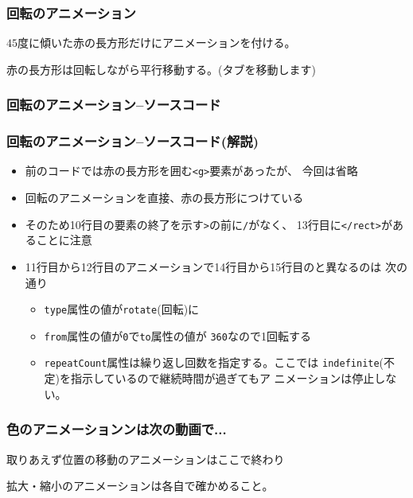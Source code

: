 \begin{frame}[containsverbatim]
 \frametitle{回転のアニメーション}
 $45$度に傾いた赤の長方形だけにアニメーションを付ける。

 赤の長方形は回転しながら平行移動する。(タブを移動します)
\end{frame}
\begin{frame}[containsverbatim]
 \frametitle{回転のアニメーション--ソースコード}
\end{frame}
\begin{frame}[containsverbatim]
 \frametitle{回転のアニメーション--ソースコード(解説)}
 \begin{itemize}
  \item 前のコードでは赤の長方形を囲む\texttt{<g>}要素があったが、
        今回は省略
  \item 回転のアニメーションを直接、赤の長方形につけている
  \item そのため10行目の要素の終了を示す\texttt{>}の前に\texttt{/}がなく、
        13行目に\texttt{</rect>}があることに注意
  \item 11行目から12行目のアニメーションで14行目から15行目のと異なるのは
        次の通り
  \begin{itemize}
   \item \texttt{type}属性の値が\texttt{rotate}(回転)に
   \item \texttt{from}属性の値が\texttt{0}で\texttt{to}属性の値が
         \texttt{360}なので1回転する
   \item \texttt{repeatCount}属性は繰り返し回数を指定する。ここでは
         \texttt{indefinite}(不定)を指示しているので継続時間が過ぎてもア
         ニメーションは停止しない。
  \end{itemize}
 \end{itemize}
\end{frame}
\begin{frame}[containsverbatim]
 \frametitle{色のアニメーションンは次の動画で...}
 取りあえず位置の移動のアニメーションはここで終わり

 拡大・縮小のアニメーションは各自で確かめること。
\end{frame}

\begin{frame}[containsverbatim]
\frametitle{}
\end{frame}

